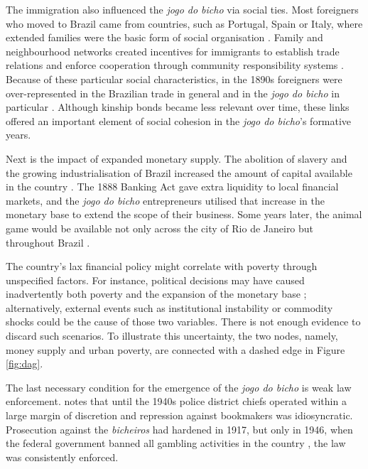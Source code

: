 The immigration also influenced the \emph{jogo do bicho} via social ties. Most foreigners who moved to Brazil came from countries, such as Portugal, Spain or Italy, where extended families were the basic form of social organisation \citep{klein1994imigraccao, lobo2001imigraccao, trento1989outro}. Family and neighbourhood networks created incentives for immigrants to establish trade relations and enforce cooperation through community responsibility systems \citep{roth2014prison}. Because of these particular social characteristics, in the 1890s foreigners were over-represented in the Brazilian trade in general \citep{mattos1991vadios, oliveira2001brasil, truzzi2008patricios} and in the \emph{jogo do bicho} in particular \citep{godoi2012imigraccao, magalhaes2005ganhou, torcato2011repressao, villar2008contravencao}. Although kinship bonds became less relevant over time, these links offered an important element of social cohesion in the \emph{jogo do bicho}'s formative years.

Next is the impact of expanded monetary supply. The abolition of slavery and the growing industrialisation of Brazil increased the amount of capital available in the country \citep{franco1987reformas, schulz2008financial}. The 1888 Banking Act gave extra liquidity to local financial markets, and the \emph{jogo do bicho} entrepreneurs utilised that increase in the monetary base to extend the scope of their business. Some years later, the animal game would be available not only across the city of Rio de Janeiro but throughout Brazil \citep[76]{da1999aguias}.

The country's lax financial policy might correlate with poverty through unspecified factors. For instance, political decisions may have caused inadvertently both poverty and the expansion of the monetary base \citep{mattos2013shantytown, schmidt1982modernization}; alternatively, external events such as institutional instability \citep{costantini2014index, fausto2014concise, luna2014economic} or commodity shocks \citep{musacchio2014colonial} could be the cause of those two variables. There is not enough evidence to discard such scenarios. To illustrate this uncertainty, the two nodes, namely, money supply and urban poverty, are connected with a dashed edge in Figure \ref{fig:dag}.

The last necessary condition for the emergence of the \emph{jogo do bicho} is weak law enforcement. \citet[69--100]{chazkel2011laws} notes that until the 1940s police district chiefs operated within a large margin of discretion and repression against bookmakers was idiosyncratic. Prosecution against the \emph{bicheiros} had hardened in 1917, but only in 1946, when the federal government banned all gambling activities in the country \citep[155--156]{magalhaes2005ganhou}, the law was consistently enforced.

